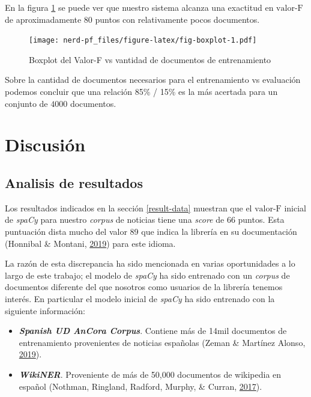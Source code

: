 \documentclass[12pt,a4paper,]{scrartcl}
\providecommand{\tightlist}{%
  \setlength{\itemsep}{0pt}\setlength{\parskip}{0pt}}
\begin{document}
En la figura \ref{fig:fig-boxplot} se puede ver que nuestro sistema alcanza una exactitud en \(\text{valor-F}\) de aproximadamente 80 puntos con relativamente pocos documentos.

\begin{figure}[H]

{\centering \texttt{[image: nerd-pf\_files/figure-latex/fig-boxplot-1.pdf]} 

}

\caption{Boxplot del Valor-F vs vantidad de documentos de entrenamiento}\label{fig:fig-boxplot}
\end{figure}

Sobre la cantidad de documentos necesarios para el entrenamiento vs evaluación podemos concluir que una relación 85\% / 15\% es la más acertada para un conjunto de \(4000\) documentos.

\newpage

\hypertarget{discussion}{%
\section{Discusión}\label{discussion}}

\hypertarget{analisis-de-resultados}{%
\subsection{Analisis de resultados}\label{analisis-de-resultados}}

Los resultados indicados en la sección \ref{result-data} muestran que el \(\text{valor-F}\) inicial de \emph{spaCy} para nuestro \emph{corpus} de noticias tiene una \emph{score} de 66 puntos. Esta puntuación dista mucho del valor 89 que indica la librería en su documentación (Honnibal \& Montani, \protect\hyperlink{ref-spacy-spanish-model}{2019}) para este idioma.

La razón de esta discrepancia ha sido mencionada en varias oportunidades a lo largo de este trabajo; el modelo de \emph{spaCy} ha sido entrenado con un \emph{corpus} de documentos diferente del que nosotros como usuarios de la librería tenemos interés. En particular el modelo inicial de \emph{spaCy} ha sido entrenado con la siguiente información:

\begin{itemize}
\tightlist
\item
  \textbf{\emph{Spanish UD AnCora Corpus}}. Contiene más de 14mil documentos de entrenamiento provenientes de noticias españolas (Zeman \& Martínez Alonso, \protect\hyperlink{ref-ancora-es}{2019}).
\item
  \textbf{\emph{WikiNER}}. Proveniente de más de 50,000 documentos de wikipedia en español (Nothman, Ringland, Radford, Murphy, \& Curran, \protect\hyperlink{ref-Nothman2017}{2017}).
\end{itemize}
\end{document}

